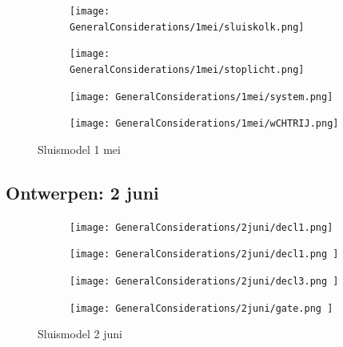 \documentclass{article}
\begin{document}
	
	\begin{figure}
		\centering
		\begin{subfigure}{0.45\linewidth}
			\texttt{[image: GeneralConsiderations/1mei/sluiskolk.png]}
			\caption{}
			\label{fig:1a}
		\end{subfigure}\hfill
		\begin{subfigure}{0.45\linewidth}
			\texttt{[image: GeneralConsiderations/1mei/stoplicht.png]}
			\caption{}
			\label{fig:1a}
		\end{subfigure}
		
		\begin{subfigure}{0.45\linewidth}
			\texttt{[image: GeneralConsiderations/1mei/system.png]}
			\caption{}
			\label{fig:1a}
		\end{subfigure}\hfill
		\begin{subfigure}{0.45\linewidth}
			\texttt{[image: GeneralConsiderations/1mei/wCHTRIJ.png]}
			\caption{}
			\label{fig:1a}
		\end{subfigure}
		\caption{Sluismodel 1 mei}
		\label{fig:1}
	\end{figure}
	\newpage
	\subsection{Ontwerpen: 2 juni}
	
	
	
	\begin{figure}
		\centering
		\begin{subfigure}{0.45\linewidth}
			\texttt{[image: GeneralConsiderations/2juni/decl1.png]}
			\caption{}
			\label{fig:1a}
		\end{subfigure}\hfill
		\begin{subfigure}{0.45\linewidth}
			\texttt{[image: GeneralConsiderations/2juni/decl1.png ]}
			\caption{}
			\label{fig:1a}
		\end{subfigure}
		
		\begin{subfigure}{0.45\linewidth}
			\texttt{[image: GeneralConsiderations/2juni/decl3.png ]}
			\caption{}
			\label{fig:1a}
		\end{subfigure}\hfill
		\begin{subfigure}{0.45\linewidth}
			\texttt{[image: GeneralConsiderations/2juni/gate.png ]}
			\caption{}
			\label{fig:1a}
		\end{subfigure}
		\caption{Sluismodel 2 juni}
		\label{fig:1}
	\end{figure}
	
\end{document}
